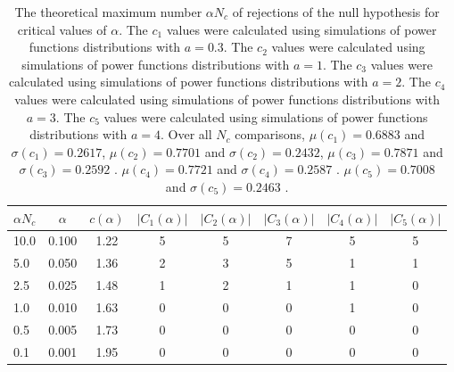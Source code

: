 \begin{table}[h!]
\begin{center}
\begin{tabular}{| l | c | c | c | c | c | c | c |}\hline
$\alpha N_c$ & $\alpha$ & $c(\alpha)$ & $|C_1(\alpha)|$ & $|C_2(\alpha)|$ & $|C_3(\alpha)|$ & $|C_4(\alpha)|$ & $|C_5(\alpha)|$ \\\hline
10.0 & 0.100 & 1.22 & 5 & 5 & 7 & 5 & 5 \\\hline
5.0 & 0.050 & 1.36 & 2 & 3 & 5 & 1 & 1 \\\hline
2.5 & 0.025 & 1.48 & 1 & 2 & 1 & 1 & 0 \\\hline
1.0 & 0.010 & 1.63 & 0 & 0 & 0 & 1 & 0 \\\hline
0.5 & 0.005 & 1.73 & 0 & 0 & 0 & 0 & 0 \\\hline
0.1 & 0.001 & 1.95 & 0 & 0 & 0 & 0 & 0 \\\hline
\end{tabular}
\caption{The theoretical maximum number $\alpha N_c$ of rejections
of the null hypothesis for critical values of $\alpha$.
The $c_1$ values were calculated using simulations of power functions distributions with $a=0.3$.
The $c_2$ values were calculated using simulations of power functions distributions with $a=1$.
The $c_3$ values were calculated using simulations of power functions distributions with $a=2$.
The $c_4$ values were calculated using simulations of power functions distributions with $a=3$.
The $c_5$ values were calculated using simulations of power functions distributions with $a=4$.
Over all $N_c$ comparisons,
 $\mu(c_1)=0.6883$ and $\sigma(c_1)=0.2617$,
 $\mu(c_2)=0.7701$ and $\sigma(c_2)=0.2432$,
 $\mu(c_3)=0.7871$ and $\sigma(c_3)=0.2592$ .
 $\mu(c_4)=0.7721$ and $\sigma(c_4)=0.2587$ .
 $\mu(c_5)=0.7008$ and $\sigma(c_5)=0.2463$ .
}
\end{center}
\end{table}